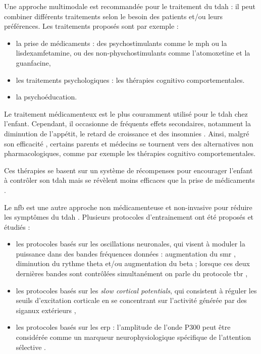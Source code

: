 Une approche multimodale est recommandée pour le traitement du \gls{tdah} : il peut combiner différents traitements selon le besoin 
des patients et/ou leurs préférences. Les traitements proposés sont par exemple \citep{HAS} :
\begin{itemize}
\item la prise de médicaments : des psychostimulants comme le \gls{mph} ou la lisdexamfetamine, ou des non-physchostimulants comme l'atomoxetine 
et la guanfacine,
\item les traitements psychologiques : les thérapies cognitivo comportementales.
\item la psychoéducation.
\end{itemize} 

Le traitement médicamenteux est le plus couramment utilisé pour le \gls{tdah} chez l'enfant. Cependant, il occasionne de fréquents effets secondaires,
notamment la diminution de l'appétit, le retard de croissance et des insomnies \citep{Sousa2012}. Ainsi, malgré son efficacité \citep{Taylor2014,
Storebo2015, Swanson2017}, certains parents et médecins se tournent vers des alternatives non pharmacologiques, comme par exemple les thérapies cognitivo 
comportementales.

Ces thérapies se basent sur un système de récompenses pour encourager l'enfant à contrôler son \gls{tdah} \citep{Evans2011, Sonuga2004} mais se révèlent
moins efficaces que la prise de médicaments \citep{Sonuga-Barke2013}. 

Le \gls{nfb} est une autre approche non médicamenteuse et non-invasive pour réduire les symptômes du \gls{tdah} \citep{Arns2015, Marzbani2016}. Plusieurs
protocoles d'entrainement ont été proposés et étudiés :
\begin{itemize}
\item les protocoles basés sur les oscillations neuronales, qui visent à moduler la puissance dans des bandes fréquences données : augmentation du 
\gls{smr} \citep{Beauregard2006}, diminution du rythme theta et/ou augmentation du beta \citep{Arns2015, Kropotov2005} ; lorsque ces deux dernières 
bandes sont contrôlées simultanément on parle du protocole \gls{tbr} \citep{Lubar1976, Arns2013}, 
\item les protocoles basés sur les \textit{slow cortical potentials}, qui consistent à réguler les seuils d'excitation corticale en se concentrant sur l'activité 
générée par des siganux extérieurs \citep{Heinrich2004, Banaschewski2007},
\item les protocoles basés sur les \gls{erp} : l'amplitude de l'onde P300 peut être considérée comme un marqueur neurophysiologique spécifique de l'attention 
sélective \citep{Fouillen2017}.
\end{itemize}

